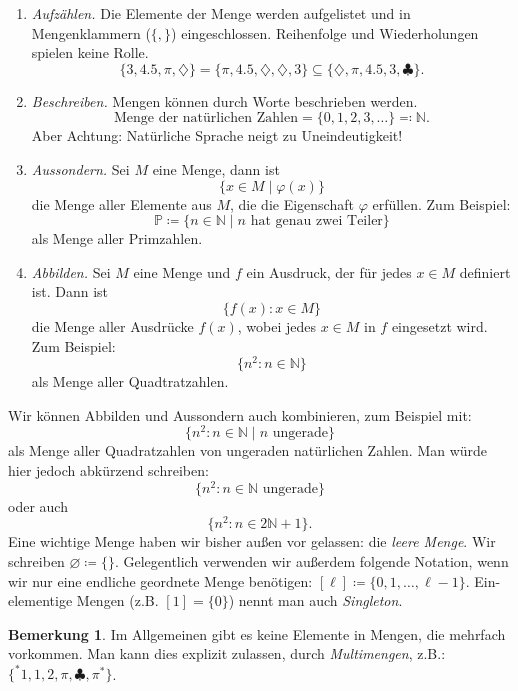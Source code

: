 \documentclass[11pt, a4paper]{article}
\theoremstyle{definition}
\newtheorem*{remark*}{Bemerkung}
\theoremstyle{plain}
\numberwithin{equation}{section}
\let\emptyset\varnothing
\begin{document}
\begin{enumerate}
	\item \textit{Aufzählen.} Die Elemente der Menge werden aufgelistet und in Mengenklammern (\( \{, \} \)) eingeschlossen. Reihenfolge und Wiederholungen spielen keine Rolle.
		\[
			\{ 3, 4.5, \pi, \diamondsuit \} = \{ \pi, 4.5, \diamondsuit, \diamondsuit, 3 \} \subseteq \{ \diamondsuit, \pi, 4.5, 3, \clubsuit \}. 
		\]
	\item \textit{Beschreiben.} Mengen können durch Worte beschrieben werden.
		\[
			\text{Menge der natürlichen Zahlen} = \{ 0, 1, 2, 3, \ldots \} \eqqcolon \mathbb{N}.
		\]
		Aber Achtung: Natürliche Sprache neigt zu Uneindeutigkeit!
	\item \textit{Aussondern.} Sei \( M \) eine Menge, dann ist
		\[
			\{ x \in M \mid \varphi(x) \}
		\]
		die Menge aller Elemente aus \( M \), die die Eigenschaft \( \varphi \) erfüllen. Zum Beispiel:
		\[
			\mathbb{P} \coloneqq \{ n \in \mathbb{N} \mid n \text{ hat genau zwei Teiler} \}
		\]
		als Menge aller Primzahlen.
	\item \textit{Abbilden.} Sei \( M \) eine Menge und \( f \) ein Ausdruck, der für jedes \( x \in M \) definiert ist. Dann ist
		\[
			\{ f(x) : x \in M \}
		\]
		die Menge aller Ausdrücke \( f(x) \), wobei jedes \( x \in M \) in \( f \) eingesetzt wird. Zum Beispiel:
		\[
			\{ n^2 : n \in \mathbb{N} \}
		\]
		als Menge aller Quadtratzahlen.
\end{enumerate}
Wir können Abbilden und Aussondern auch kombinieren, zum Beispiel mit:
\[
	\{ n^2 : n \in \mathbb{N} \mid n \text{ ungerade} \}
\]
als Menge aller Quadratzahlen von ungeraden natürlichen Zahlen. Man würde hier jedoch abkürzend schreiben:
\[
	\{ n^2 : n \in \mathbb{N} \text{ ungerade} \}
\]
oder auch
\[
	\{ n^2 : n \in 2\mathbb{N}+1 \}.
\]
Eine wichtige Menge haben wir bisher außen vor gelassen: die \textit{leere Menge}. Wir schreiben \( \emptyset \coloneqq \{ \} \). Gelegentlich verwenden wir außerdem folgende Notation, wenn wir nur eine endliche geordnete Menge benötigen: \( [\ell] \coloneqq \{ 0, 1, \ldots, \ell-1 \} \). Ein-elementige Mengen (z.B. \( [1] = \{ 0 \} \)) nennt man auch \textit{Singleton}.
\begin{remark*}
	Im Allgemeinen gibt es keine Elemente in Mengen, die mehrfach vorkommen. Man kann dies explizit zulassen, durch \textit{Multimengen}, z.B.: \( \{^\ast 1, 1, 2, \pi, \clubsuit, \pi ^\ast\} \).
\end{remark*}
\end{document}
